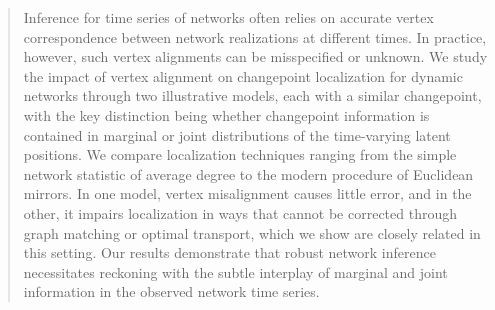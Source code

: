 \documentclass[12pt]{article}
\theoremstyle{definition}
\begin{document}
\begin{abstract}


Inference for time series of networks often relies on accurate vertex correspondence between network realizations at different times. In practice, however, such vertex alignments can be misspecified or unknown. We study the impact of vertex alignment on changepoint localization for dynamic networks through two illustrative models, each with a similar changepoint, with
the key distinction being whether changepoint information is contained in marginal or joint distributions of the time-varying latent positions.
We compare localization techniques ranging from the simple network statistic of average degree to the modern procedure of Euclidean mirrors. 
In one model, vertex misalignment causes little error, and in the other, it impairs localization in ways that cannot be corrected through graph matching or optimal transport, which we show are closely related in this setting. 
Our results demonstrate that robust network inference necessitates reckoning with the subtle interplay of marginal and joint information in the observed network time series.






\end{abstract}
\end{document}
